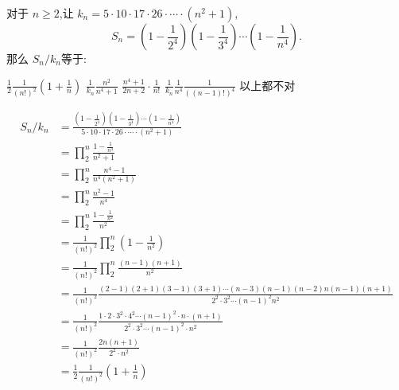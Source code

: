 \documentclass[answers]{exam}
\begin{document}
\begin{questions}
	\question 对于 \( n \ge 2 \),让 \( k_n = 5 \cdot 10 \cdot 17 \cdot 26 \cdot\cdots\cdot (n^2 + 1) \),
	\begin{equation*}
		S_n = (1-\frac{1}{2^4})(1-\frac{1}{3^4})\cdots(1-\frac{1}{n^4}).
	\end{equation*}
	那么 \( S_n / k_n \)等于:

	\begin{oneparchoices}
		\CorrectChoice \(\displaystyle \frac{1}{2}\frac{1}{(n!)^2}(1+\frac{1}{n}) \)
		\choice \(\displaystyle \frac{1}{k_n}\frac{n^2}{n^4 + 1} \)
		\choice \(\displaystyle \frac{n^4 + 1}{2n+2}\cdot \frac{1}{n!} \)
		\choice \(\displaystyle \frac{1}{k_n}\frac{1}{n^4}\frac{1}{((n-1)!)^4} \)
		\choice 以上都不对
	\end{oneparchoices}

	\begin{solution}
		\begin{align*}
			S_n / k_n & = \frac{(1-\frac{1}{2^4})(1-\frac{1}{3^4})\cdots(1-\frac{1}{n^4})}{5 \cdot 10 \cdot 17 \cdot 26
			\cdot\cdots\cdot (n^2 + 1)}                                                                                 \\
			          & = \prod_2^n\frac{1 - \frac{1}{n^4}}{n^2 + 1}                                                    \\
			          & = \prod_2^n\frac{n^4 - 1}{n^4(n^2+1)}                                                           \\
			          & = \prod_2^n\frac{n^2 - 1}{n^4}                                                                  \\
			          & = \prod_2^n\frac{1 - \frac{1}{n^2}}{n^2}                                                        \\
			          & = \frac{1}{(n!)^2} \prod_2^n(1-\frac{1}{n^2})                                                   \\
			          & = \frac{1}{(n!)^2} \prod_2^n\frac{(n-1)(n+1)}{n^2}                                              \\
			          & = \frac{1}{(n!)^2} \frac{(2-1)(2+1)(3-1)(3+1)\cdots
			(n-3)(n-1)(n-2)n(n-1)(n+1)}{2^2\cdot3^2\cdots (n-1)^2n^2}                                                   \\
			          & = \frac{1}{(n!)^2} \frac{1\cdot2\cdot 3^2 \cdot 4^2 \cdots (n-1)^2 \cdot n \cdot
			(n+1)}{2^2\cdot3^2\cdots (n-1)^2\cdot n^2}                                                                  \\
			          & = \frac{1}{(n!)^2} \frac{2n(n+1)}{2^2\cdot n^2}                                                 \\
			          & = \frac12\frac1{(n!)^2}(1+\frac1n)
		\end{align*}
	\end{solution}


\end{questions}
\end{document}
